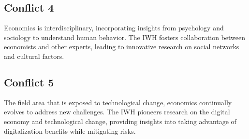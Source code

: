 \documentclass{article}
\begin{document}
\subsection{Conflict 4}
Economics is interdisciplinary, incorporating insights from psychology and sociology to understand human behavior. The IWH fosters collaboration between economists and other experts, leading to innovative research on social networks and cultural factors.

\subsection{Conflict 5}
The field area that is exposed to technological change, economics continually evolves to address new challenges. The IWH pioneers research on the digital economy and technological change, providing insights into taking advantage of digitalization benefits while mitigating risks.

\end{document}
